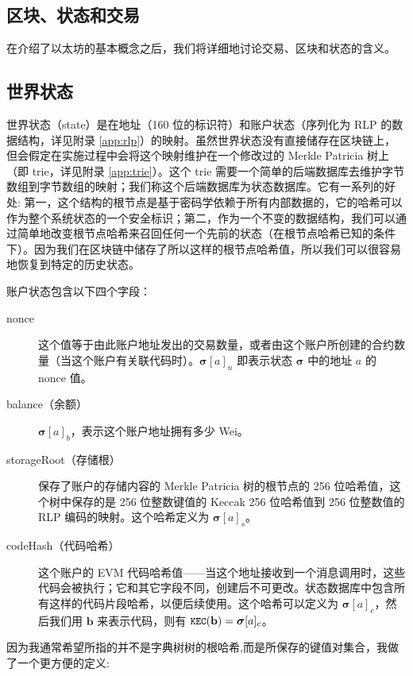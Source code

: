 \documentclass[9pt,oneside]{amsart}
\begin{document}
\begin{multicols}{2}
\section{区块、状态和交易} \label{ch:bst}

在介绍了以太坊的基本概念之后，我们将详细地讨论交易、区块和状态的含义。

\subsection{世界状态} \label{ch:state}


世界状态（state）是在地址（160 位的标识符）和账户状态（序列化为 RLP 的数据结构，详见附录 \ref{app:rlp}）的映射。虽然世界状态没有直接储存在区块链上，但会假定在实施过程中会将这个映射维护在一个修改过的 Merkle Patricia 树上（即 trie，详见附录 \ref{app:trie}）。这个 trie 需要一个简单的后端数据库去维护字节数组到字节数组的映射；我们称这个后端数据库为状态数据库。它有一系列的好处: 第一，这个结构的根节点是基于密码学依赖于所有内部数据的，它的哈希可以作为整个系统状态的一个安全标识；第二，作为一个不变的数据结构，我们可以通过简单地改变根节点哈希来召回任何一个先前的状态（在根节点哈希已知的条件下）。因为我们在区块链中储存了所以这样的根节点哈希值，所以我们可以很容易地恢复到特定的历史状态。

账户状态包含以下四个字段：
\begin{description}
\item[nonce] 这个值等于由此账户地址发出的交易数量，或者由这个账户所创建的合约数量（当这个账户有关联代码时）。$\boldsymbol{\sigma}[a]_n$ 即表示状态 $\boldsymbol{\sigma}$ 中的地址 $a$ 的 nonce 值。
\item[balance（余额）] $\boldsymbol{\sigma}[a]_b$，表示这个账户地址拥有多少 Wei。
\item[storageRoot（存储根）] 保存了账户的存储内容的 Merkle Patricia 树的根节点的 256 位哈希值，这个树中保存的是 256 位整数键值的 Keccak 256 位哈希值到 256 位整数值的 RLP 编码的映射。这个哈希定义为 $\boldsymbol{\sigma}[a]_s$。
\item[codeHash（代码哈希）] 这个账户的 EVM 代码哈希值——当这个地址接收到一个消息调用时，这些代码会被执行；它和其它字段不同，创建后不可更改。状态数据库中包含所有这样的代码片段哈希，以便后续使用。这个哈希可以定义为 $\boldsymbol{\sigma}[a]_c$，然后我们用 $\mathbf{b}$ 来表示代码，则有 $\texttt{\small KEC}(\mathbf{b}) = \boldsymbol{\sigma}[a]_c$。
\end{description}


因为我通常希望所指的并不是字典树树的根哈希,而是所保存的键值对集合，我做了一个更方便的定义:


\end{multicols}
\end{document}

